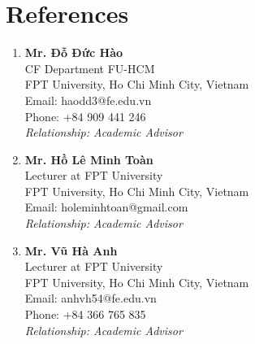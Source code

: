 \documentclass[a4paper,11pt]{article}
\begin{document}
\section{\textbf{References}}
\vspace{-0.2mm}
\small{
\begin{enumerate}[leftmargin=*,labelsep=2mm]
\item \textbf{Mr. Đỗ Đức Hào}\\
   CF Department FU-HCM\\
   FPT University, Ho Chi Minh City, Vietnam\\
   Email: haodd3@fe.edu.vn\\
   Phone: +84 909 441 246\\
   \textit{Relationship: Academic Advisor}

\item \textbf{Mr. Hồ Lê Minh Toàn}\\
   Lecturer at FPT University\\
   FPT University, Ho Chi Minh City, Vietnam\\
   Email: holeminhtoan@gmail.com\\
   \textit{Relationship: Academic Advisor}

\item \textbf{Mr. Vũ Hà Anh}\\
   Lecturer at FPT University\\
   FPT University, Ho Chi Minh City, Vietnam\\
   Email: anhvh54@fe.edu.vn\\
   Phone: +84 366 765 835\\
   \textit{Relationship: Academic Advisor}
\end{enumerate}
}
\end{document}
